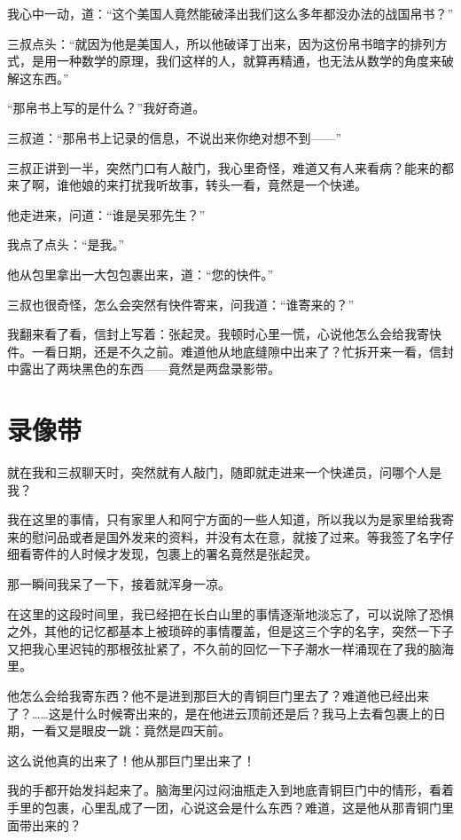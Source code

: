我心中一动，道：“这个美国人竟然能破泽出我们这么多年都没办法的战国帛书？”

三叔点头：“就因为他是美国人，所以他破译丁出来，因为这份帛书暗字的排列方式，是用一种数学的原理，我们这样的人，就算再精通，也无法从数学的角度来破解这东西。”

“那帛书上写的是什么？”我好奇道。

三叔道：“那帛书上记录的信息，不说出来你绝对想不到——”

三叔正讲到一半，突然门口有人敲门，我心里奇怪，难道又有人来看病？能来的都来了啊，谁他娘的来打扰我听故事，转头一看，竟然是一个快递。

他走进来，问道：“谁是吴邪先生？”

我点了点头：“是我。”

他从包里拿出一大包包裹出来，道：“您的快件。”

三叔也很奇怪，怎么会突然有快件寄来，问我道：“谁寄来的？”

我翻来看了看，信封上写着：张起灵。我顿时心里一慌，心说他怎么会给我寄快件。一看日期，还是不久之前。难道他从地底缝隙中出来了？忙拆开来一看，信封中露出了两块黑色的东西——竟然是两盘录影带。

\chapter{录像带}

就在我和三叔聊天时，突然就有人敲门，随即就走进来一个快递员，问哪个人是我？

我在这里的事情，只有家里人和阿宁方面的一些人知道，所以我以为是家里给我寄来的慰问品或者是国外发来的资料，并没有太在意，就接了过来。等我签了名字仔细看寄件的人时候才发现，包裹上的署名竟然是张起灵。

那一瞬间我呆了一下，接着就浑身一凉。

在这里的这段时间里，我已经把在长白山里的事情逐渐地淡忘了，可以说除了恐惧之外，其他的记忆都基本上被琐碎的事情覆盖，但是这三个字的名字，突然一下子又把我心里迟钝的那根弦扯紧了，不久前的回忆一下子潮水一样涌现在了我的脑海里。

他怎么会给我寄东西？他不是进到那巨大的青铜巨门里去了？难道他已经出来了？……这是什么时候寄出来的，是在他进云顶前还是后？我马上去看包裹上的日期，一看又是眼皮一跳：竟然是四天前。

这么说他真的出来了！他从那巨门里出来了！

我的手都开始发抖起来了。脑海里闪过闷油瓶走入到地底青铜巨门中的情形，看着手里的包裹，心里乱成了一团，心说这会是什么东西？难道，这是他从那青铜门里面带出来的？

